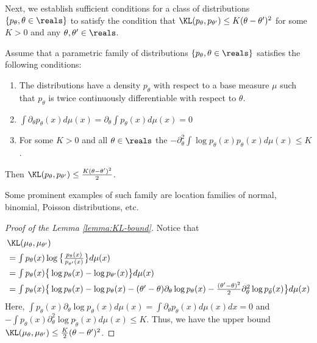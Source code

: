 Next, we establish sufficient conditions for a class of distributions $\{p_\theta, \theta\in \reals\}$ to satisfy the condition that $\KL(p_\theta, p_{\theta'}) \le K(\theta - \theta')^2$ for some $K> 0$ and any $\theta, \theta'\in \reals$. 
\begin{lemma}\label{lemma:KL-bound}
    Assume that a parametric family of distributions $\{p_\theta, \theta\in \reals\}$ satisfies the following conditions: 
    \begin{enumerate}
        \item The distributions have a density $p_\theta$ with respect to a base measure $\mu$ such that $p_\theta$ is twice continuously differentiable with respect to $\theta$. 
        \item  $\textstyle \int  \partial_\theta  p_\theta (x) d\mu(x) = \partial_\theta \int \textstyle   p_\theta (x)d\mu(x) = 0$
        \item For some $K> 0$ and all $\theta \in \reals$ the  $\textstyle - \partial_\theta^2 \int \textstyle  \log p_\theta (x) p_\theta(x)d\mu(x) \le K$.
    \end{enumerate}
    Then $\KL(p_\theta, p_{\theta'}) \le \frac{K(\theta - \theta')^2}2$.
\end{lemma}
Some prominent examples of such family are location families of normal, binomial, Poisson distributions, etc.

\begin{proof}[Proof of the Lemma \ref{lemma:KL-bound}]
    Notice that 
    \[
\begin{aligned}
    &\textstyle \KL(\mu_\theta, \mu_{\theta'})\\
    & = \textstyle \int  p_{\theta}(x) \log\big\{  \frac{p_\theta (x)}{p_{\theta'}(x)}\big\} d\mu(x) \\
    & = \textstyle \int  p_{\theta}(x)\big\{  \log p_\theta(x) - \log p_{\theta'}(x)\big \}  d\mu(x)\\
    & = \textstyle \int  p_{\theta}(x)\big\{  \log p_\theta(x) - \log p_{\theta}(x) - (\theta' - \theta) \partial_\theta \log p_\theta (x)  - \frac{(\theta' - \theta)^2}{2}\partial^2_\theta \log p_{\tilde \theta} (x) \big \}  d\mu(x)\\
\end{aligned}
\] Here, 
$\int p_\theta (x) \partial _\theta \log p_\theta (x) d\mu(x) = \int \partial _\theta  p_\theta (x) d\mu(x) dx =0$ and  $- \int p_\theta (x) \partial^2 _\theta \log p_{\tilde \theta} (x)d\mu(x) \le K$. Thus, we have the upper bound $\KL(\mu_\theta, \mu_{\theta'}) \le \frac{K}{2}(\theta - \theta')^2$. 
\end{proof}

